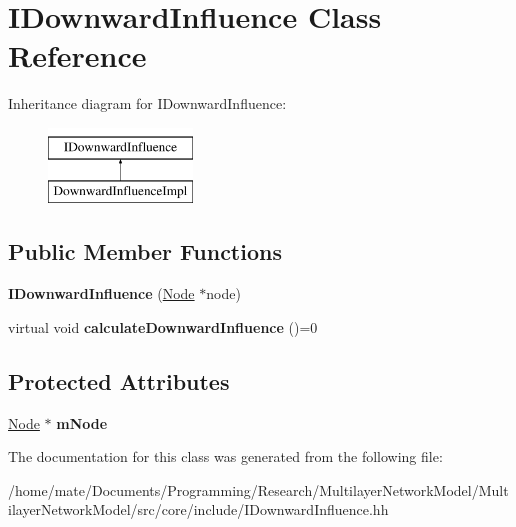 \hypertarget{classIDownwardInfluence}{}\section{I\+Downward\+Influence Class Reference}
\label{classIDownwardInfluence}
Inheritance diagram for I\+Downward\+Influence\+:\begin{figure}[H]
\begin{center}
\leavevmode
\includegraphics[height=2.000000cm]{classIDownwardInfluence}
\end{center}
\end{figure}
\subsection*{Public Member Functions}
\begin{DoxyCompactItemize}
\item 
{\bfseries I\+Downward\+Influence} (\hyperlink{classNode}{Node} $\ast$node)\hypertarget{classIDownwardInfluence_a7d5d6eb85ad3628703de8792dcebb9b5}{}\label{classIDownwardInfluence_a7d5d6eb85ad3628703de8792dcebb9b5}

\item 
virtual void {\bfseries calculate\+Downward\+Influence} ()=0\hypertarget{classIDownwardInfluence_ae6810945efb7ceb9b6e351c62bacd453}{}\label{classIDownwardInfluence_ae6810945efb7ceb9b6e351c62bacd453}

\end{DoxyCompactItemize}
\subsection*{Protected Attributes}
\begin{DoxyCompactItemize}
\item 
\hyperlink{classNode}{Node} $\ast$ {\bfseries m\+Node}\hypertarget{classIDownwardInfluence_aad871e67e020cdc589deb3739f8548a0}{}\label{classIDownwardInfluence_aad871e67e020cdc589deb3739f8548a0}

\end{DoxyCompactItemize}


The documentation for this class was generated from the following file\+:\begin{DoxyCompactItemize}
\item 
/home/mate/\+Documents/\+Programming/\+Research/\+Multilayer\+Network\+Model/\+Multilayer\+Network\+Model/src/core/include/I\+Downward\+Influence.\+hh\end{DoxyCompactItemize}
